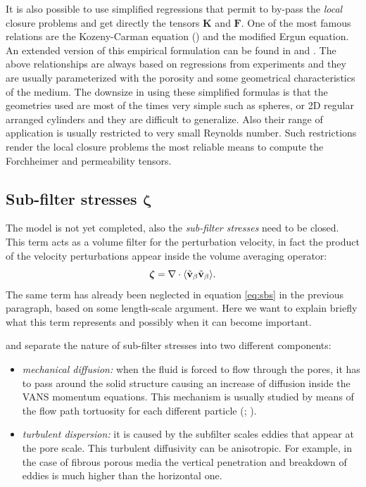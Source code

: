 It is also possible to use simplified regressions that permit to by-pass the \textit{local} closure problems and get directly the tensors $\mathbf{K}$ and $\mathbf{F}$.
One of the most famous relations are the Kozeny-Carman equation (\citet{kozeny}) and the modified Ergun equation.
An extended version of this empirical formulation can be found in \citet{zampogna2016fluid} and \citet{yazdchi2012towards}.
The above relationships are always based on regressions from experiments and they are usually parameterized with the porosity and some geometrical characteristics of the medium. The downsize in using these simplified formulas is that the geometries used are most of the times very simple such as spheres, or 2D regular arranged cylinders and they are difficult to generalize. Also their range of application is usually restricted to very small Reynolds number. Such restrictions render the local closure problems the most reliable means to compute the Forchheimer and permeability tensors.

\subsection{Sub-filter stresses $\boldsymbol{\zeta}$}

The model is not yet completed, also the \textit{sub-filter stresses} need to be closed. This term acts as a volume filter for the perturbation velocity, in fact the product of the velocity perturbations appear inside the volume averaging operator:
$$\boldsymbol{\zeta} = \nabla \cdot {\left< \tilde{\textbf{v}}_{\beta}\tilde{\textbf{v}}_{\beta}\right>}.$$
The same term has already been neglected in equation \eqref{eq:sbs} in the previous paragraph, based on some length-scale argument.  Here we want to explain briefly what this term represents and possibly when it can become important.

\citet{breugem2006influence} and \citet{nepf1999drag} separate the nature of sub-filter stresses into two different components:
\begin{itemize}
	\item \textit{mechanical diffusion:} when the fluid is forced to flow through the pores, it has to pass around the solid structure causing an increase of diffusion inside the VANS momentum equations. This mechanism is usually studied by means of the flow path tortuosity for each different particle (\citet{duda2011hydraulic}; \citet{sivanesapillai2014transition}).
	\item \textit{turbulent dispersion:} it is caused by the subfilter scales eddies that appear at the pore scale. This turbulent diffusivity can be anisotropic. For example, in the case of fibrous porous media the vertical penetration and breakdown of eddies is much higher than the horizontal one.
\end{itemize}

